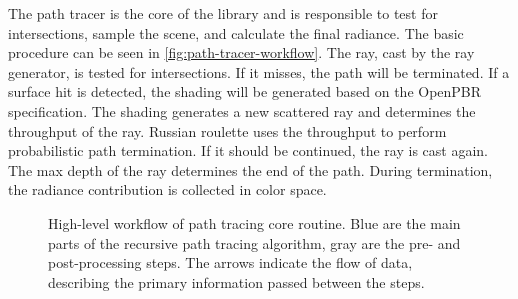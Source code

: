 The path tracer is the core of the library and is responsible to test for intersections, sample the scene, and calculate the final radiance. The basic procedure can be seen in \autoref{fig:path-tracer-workflow}. The ray, cast by the ray generator, is tested for intersections. If it misses, the path will be terminated. If a surface hit is detected, the shading will be generated based on the \gls{OpenPBR} specification. The shading generates a new scattered ray and determines the throughput of the ray. Russian roulette uses the throughput to perform probabilistic path termination. If it should be continued, the ray is cast again. The max depth of the ray determines the end of the path. During termination, the radiance contribution is collected in  color space.

\begin{figure}[H]
    \centering
    \caption{High-level workflow of path tracing core routine. Blue are the main parts of the recursive path tracing algorithm, gray are the pre- and post-processing steps. The arrows indicate the flow of data, describing the primary information passed between the steps.}
    \label{fig:path-tracer-workflow}
  \end{figure}

